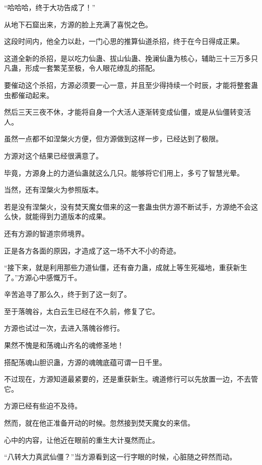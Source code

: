 
\begin{this_body}

“哈哈哈，终于大功告成了！”

从地下石窟出来，方源的脸上充满了喜悦之色。

这段时间内，他全力以赴，一门心思的推算仙道杀招，终于在今日得成正果。

这道全新的杀招，是以吃力仙蛊、拔山仙蛊、挽澜仙蛊为核心，辅助三十三万多只凡蛊，形成一套繁芜至极，令人眼花缭乱的搭配。

要催动这个杀招，方源必须要一心一意，并且至少得持续一个时辰，才能将整套蛊虫都催动起来。

然后三天三夜不休，才能将自身一个大活人逐渐转变成仙僵，或是从仙僵转变活人。

虽然一点都不如涅槃火方便，但方源做到这样一步，已经达到了极限。

方源对这个结果已经很满意了。

毕竟，方源身上的力道仙蛊就这么几只。能够将它们用上，多亏了智慧光晕。

当然，还有涅槃火为参照版本。

若是没有涅槃火，没有焚天魔女借来的这一套蛊虫供方源不断试手，方源绝不会这么快，就能得到力道版本的成果。

还有方源的智道宗师境界。

正是各方各面的原因，才造成了这一场不大不小的奇迹。

“接下来，就是利用那些力道仙僵，还有奋力蛊，成就上等生死福地，重获新生了。”方源心中感慨万千。

辛苦追寻了那么久，终于到了这一刻了。

至于落魄谷，太白云生已经在不久前，修复了它。

方源也试过一次，去进入落魄谷修行。

果然不愧是和荡魂山齐名的魂修圣地！

搭配荡魂山胆识蛊，方源的魂魄底蕴可谓一日千里。

不过现在，方源知道最紧要的，还是重获新生。魂道修行可以先放置一边，不去管它。

方源已经有些迫不及待。

然而，就在他正准备开动的时候。忽然接到焚天魔女的来信。

心中的内容，让他近在眼前的重生大计戛然而止。

“八转大力真武仙僵？”当方源看到这一行字眼的时候，心脏随之砰然而动。


\end{this_body}
